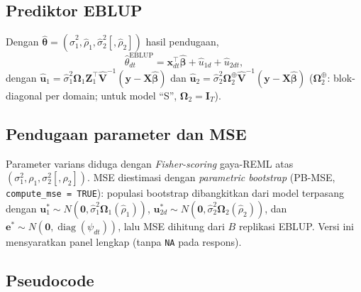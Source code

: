 \documentclass[11pt,a4paper]{article}
\theoremstyle{definition}
\begin{document}
\subsection{Prediktor EBLUP}

Dengan $\hat{\boldsymbol{\theta}} = (\hat{\sigma}_1^2, \hat{\rho}_1, \hat{\sigma}_2^2[, \hat{\rho}_2])$
hasil pendugaan,
\begin{equation}
  \hat{\theta}_{dt}^{\mathrm{EBLUP}}
  = \mathbf{x}_{dt}^{\top}\hat{\boldsymbol{\beta}}
    + \hat{u}_{1d} + \hat{u}_{2dt},
\end{equation}
dengan $\hat{\mathbf{u}}_1 = \hat{\sigma}_1^2\boldsymbol{\Omega}_1
\mathbf{Z}_1^{\top}\hat{\mathbf{V}}^{-1}(\mathbf{y}-\mathbf{X}\hat{\boldsymbol{\beta}})$
dan $\hat{\mathbf{u}}_2 = \hat{\sigma}_2^2\boldsymbol{\Omega}_2^{\oplus}
\hat{\mathbf{V}}^{-1}(\mathbf{y}-\mathbf{X}\hat{\boldsymbol{\beta}})$
($\boldsymbol{\Omega}_2^{\oplus}$: blok-diagonal per domain; untuk model ``S'',
$\boldsymbol{\Omega}_2 = \mathbf{I}_T$).

\subsection{Pendugaan parameter dan MSE}

Parameter varians diduga dengan \emph{Fisher-scoring} gaya-REML atas
$(\sigma_1^2, \rho_1, \sigma_2^2[, \rho_2])$. MSE diestimasi dengan
\emph{parametric bootstrap} (PB-MSE, \texttt{compute\_mse = TRUE}):
populasi bootstrap dibangkitkan dari model terpasang dengan
$\mathbf{u}_1^* \sim N(\mathbf{0}, \hat{\sigma}_1^2\boldsymbol{\Omega}_1(\hat{\rho}_1))$,
$\mathbf{u}_{2d}^* \sim N(\mathbf{0}, \hat{\sigma}_2^2\boldsymbol{\Omega}_2(\hat{\rho}_2))$,
dan $\mathbf{e}^* \sim N(\mathbf{0}, \operatorname{diag}(\psi_{dt}))$,
lalu MSE dihitung dari $B$ replikasi EBLUP. Versi ini mensyaratkan panel lengkap
(tanpa \texttt{NA} pada respons).

\subsection{Pseudocode}
\end{document}
